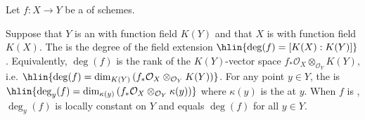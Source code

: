 \begin{definition} \label{definition:degree_of_a_finite_morphism_of_schemes}
Let $f : X \to Y$ be a  of schemes. 

Suppose that $Y$ is an  with function field $K(Y)$ and that $X$ is  with function field $K(X)$. The  is the degree of the field extension
$\hlin{\deg(f) = [K(X) : K(Y)]}$.
Equivalently, $\deg(f)$ is the rank of the $K(Y)$-vector space $f_*\mathcal{O}_X \otimes_{\mathcal{O}_Y} K(Y)$, i.e.
$\hlin{\deg(f) = \dim_{K(Y)} \left( f_*\mathcal{O}_X \otimes_{\mathcal{O}_Y} K(Y) \right)}$.
For any point $y \in Y$, the  is
$\hlin{\deg_y(f) = \dim_{\kappa(y)} \left( f_*\mathcal{O}_X \otimes_{\mathcal{O}_Y} \kappa(y) \right)}$
where $\kappa(y)$ is the  at $y$. When $f$ is , $\deg_y(f)$ is locally constant on $Y$ and equals $\deg(f)$ for all $y \in Y$.
\end{definition}
